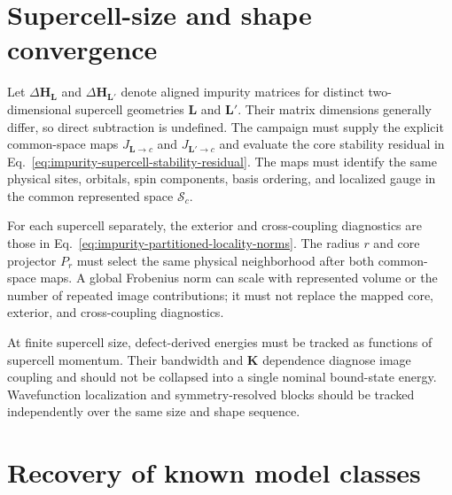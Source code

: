 \section{Supercell-size and shape convergence}

Let $\Delta\mathbf H_{\mathbf L}$ and
$\Delta\mathbf H_{\mathbf L'}$ denote aligned impurity matrices for distinct
two-dimensional supercell geometries $\mathbf L$ and $\mathbf L'$. Their
matrix dimensions generally differ, so direct subtraction is undefined. The
campaign must supply the explicit common-space maps
$J_{\mathbf L\to c}$ and $J_{\mathbf L'\to c}$ and evaluate the core stability
residual in Eq.~\eqref{eq:impurity-supercell-stability-residual}. The maps must
identify the same physical sites, orbitals, spin components, basis ordering,
and localized gauge in the common represented space $\mathcal S_c$.

For each supercell separately, the exterior and cross-coupling diagnostics are
those in Eq.~\eqref{eq:impurity-partitioned-locality-norms}. The radius $r$ and
core projector $P_r$ must select the same physical neighborhood after both
common-space maps. A global Frobenius norm can scale with represented volume or
the number of repeated image contributions; it must not replace the mapped
core, exterior, and cross-coupling diagnostics.

At finite supercell size, defect-derived energies must be tracked as functions
of supercell momentum. Their bandwidth and
$\mathbf K$ dependence diagnose image coupling and should not be collapsed into
a single nominal bound-state energy. Wavefunction localization and
symmetry-resolved blocks should be tracked independently over the same size and
shape sequence.

\section{Recovery of known model classes}

